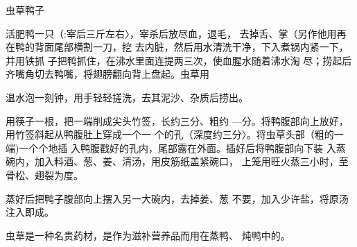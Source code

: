 \begin{recipe}{虫草鸭子}

\ingredients


\cooking

\step 活肥鸭一只（:宰后三斤左右〉，宰杀后放尽血，退毛， 去掉舌、掌（另作他用再在鸭的背面尾部横割一刀，挖 去内脏，然后用水清洗干净，下入煮锅内紧一下，并用铁抓 子把鸭抓住，在沸水里面连提两三次，使血腥水随着沸水淘 尽；捞起后齐嘴角切去鸭嘴，将翅膀翻向背上盘起。虫草用

温水泡一刻钟，用手轻轻搓洗，去其泥沙、杂质后捞出。

用筷子一根，把一端削成尖头竹签，长约三分、粗约 —分。将鸭腹部向上放好，用竹签斜起从鸭腹肚上穿成一个一 个的孔（深度约三分〉。将虫草头部（粗的一端)一个个地插 入鸭腹戳好的孔内，尾部露在外面。插好后将鸭腹部向下装 入蒸碗内，加入料酒、葱、姜、清汤，用皮筋纸盖紧碗口， 上笼用旺火蒸三小时，至骨松、翅裂为度。

\step 蒸好后把鸭子腹部向上摆入另一大碗内，去掉姜、葱 不要，加入少许盐，将原汤注入即成。

\notes

虫草是一种名贵药材，是作为滋补营养品而用在蒸鸭、 炖鸭中的。

\end{recipe}

